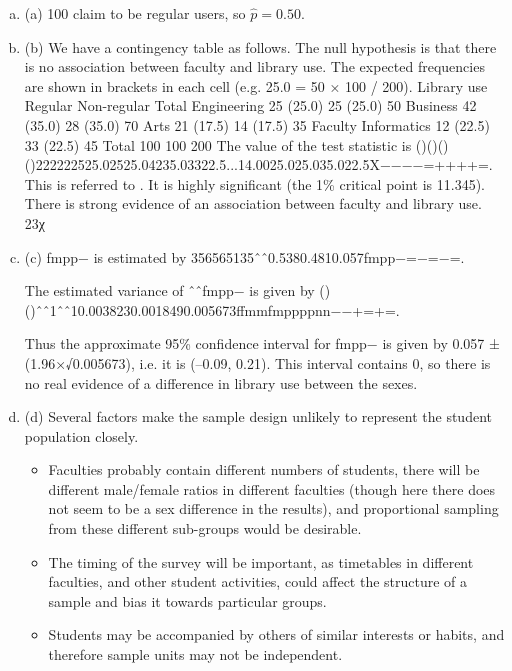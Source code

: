 \documentclass[a4paper,12pt]{article}
\begin{document}
\begin{enumerate}[(a)]
\item(a) 100 claim to be regular users, so  $\hat{p}= 0.50$.
\item (b) We have a contingency table as follows. The null hypothesis is that there is no association between faculty and library use. The expected frequencies are shown in brackets in each cell (e.g. 25.0 = 50 × 100 / 200).
Library use
Regular
Non-regular
Total
Engineering
25 (25.0)
25 (25.0)
50
Business
42 (35.0)
28 (35.0)
70
Arts
21 (17.5)
14 (17.5)
35
Faculty
Informatics
12 (22.5)
33 (22.5)
45
Total
100
100
200
The value of the test statistic is
()()()()222222525.02525.04235.03322.5...14.0025.025.035.022.5X−−−−=++++=.
This is referred to . It is highly significant (the 1\% critical point is 11.345). There is strong evidence of an association between faculty and library use. 23χ


\item(c) fmpp− is estimated by 356565135ˆˆ0.5380.4810.057fmpp−=−=−=. 

The estimated variance of ˆˆfmpp− is given by
()()ˆˆ1ˆˆ10.0038230.0018490.005673ffmmfmppppnn−−+=+=.

Thus the approximate 95\% confidence interval for fmpp− is given by 0.057 ± (1.96×√0.005673), i.e. it is (–0.09, 0.21).
This interval contains 0, so there is no real evidence of a difference in library use between the sexes.
\item (d) Several factors make the sample design unlikely to represent the student population closely. 

\begin{itemize}
    \item Faculties probably contain different numbers of students, there will be different male/female ratios in different faculties (though here there does not seem to be a sex difference in the results), and proportional sampling from these different sub-groups would be desirable.
    \item The timing of the survey will be important, as timetables in different faculties, and other student activities, could affect the structure of a sample and bias it towards particular groups.
    \item Students may be accompanied by others of similar interests or habits, and therefore sample units may not be independent.
\end{itemize}


 \end{enumerate}
 
\end{document}
